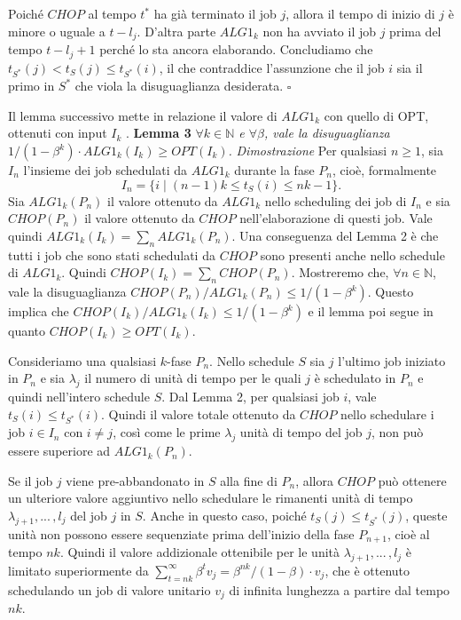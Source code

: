 \documentclass[twoside,openany,titlepage,fleqn,
	headinclude,12pt,a4paper,BCOR5mm,footinclude]{scrbook}
\newcommand*{\N}{\mathbb{N}}
\begin{document}
Poiché $CHOP$  al tempo $t^{*}$ ha già terminato il job $j$,  allora il tempo di inizio di $j$ è minore o uguale a $t - l_{j}$. D'altra parte $ALG1_{k}$ non ha avviato il job $j$ prima del tempo $t - l_{j} + 1$ perché lo sta ancora elaborando. Concludiamo che $t_{S^{*}}(j) < t_{S}(j) \leq t_{S^{*}}(i)$, il che contraddice l'assunzione che il job $i$ sia il primo in $S^{*}$ che viola la disuguaglianza desiderata. \hfill $\square$ \vspace{5mm} 

Il lemma successivo mette in relazione il valore di $ALG1_{k}$ con quello di OPT, ottenuti con input $I_{k}$ . \newline\newline
\textbf{Lemma 3} 
\textit{$\forall k \in \N$ e $\forall \beta$, vale la disuguaglianza $1/(1-\beta^{k} ) \cdot ALG1_{k}(I_{k}) \geq OPT(I_{k})$.}\newline\newline
\textit{Dimostrazione}
Per qualsiasi $n \geq 1$, sia $I_{n}$ l'insieme dei job schedulati da $ALG1_{k}$ durante la fase $P_{n}$, cioè, formalmente $$I_{n} = \{i\;| \; (n - 1)k \leq t_{S}(i) \leq nk - 1\}.$$ Sia $ALG1_{k}(P_{n})$ il valore ottenuto da $ALG1_{k}$ nello scheduling dei job di $I_{n}$ e sia $CHOP(P_{n})$ il valore ottenuto da $CHOP$ nell'elaborazione di questi job. Vale quindi $ALG1_{k}(I_{k}) = \sum_{n} ALG1_{k}(P_{n})$. Una conseguenza del Lemma 2 è che tutti i job che sono stati schedulati da $CHOP$ sono presenti anche nello schedule di $ALG1_{k}$. Quindi $CHOP(I_{k}) = \sum_{n} CHOP(P_{n})$. Mostreremo che, $\forall n \in \N$, vale la disuguaglianza $CHOP(P_{n})/ALG1_{k} (P_{n}) \leq 1/(1 - \beta^{k})$. Questo implica che $CHOP(I_{k})/ALG1_{k} (I_{k} ) \leq 1/(1 - \beta^{k})$ e il lemma poi segue in quanto $CHOP(I_{k}) \geq OPT(I_{k})$. 

Consideriamo una qualsiasi $k$-fase $P_{n}$. Nello schedule $S$ sia $j$ l'ultimo job iniziato in $P_{n}$ e sia $\lambda_{j}$ il numero di unità di tempo per le quali $j$ è schedulato in $P_{n}$ e quindi nell'intero schedule $S$. Dal Lemma 2, per qualsiasi job $i$, vale $t_{S}(i) \leq t_{S^{*}}(i)$. Quindi il valore totale ottenuto da $CHOP$ nello schedulare i job $i \in I_{n}$ con $i \neq j$, così come le prime $\lambda_{j}$ unità di tempo del job $j$, non può essere superiore ad $ALG1_{k}(P_{n})$. 

Se il job $j$ viene pre-abbandonato in $S$ alla fine di $P_{n}$, allora $CHOP$ può ottenere un ulteriore valore aggiuntivo nello schedulare le rimanenti unità di tempo $\lambda_{j + 1},...\,, l_{j}$ del job $j$ in $S$. Anche in questo caso, poiché $t_{S}(j) \leq t_{S^{*}}(j)$, queste unità non possono essere sequenziate prima dell'inizio della fase $P_{n+1}$, cioè al tempo $nk$. Quindi il valore addizionale ottenibile per le unità $\lambda_{j + 1},...\,,l_{j}$ è limitato superiormente da $\sum_{t=nk}^{\infty} \beta^{t} v_{j} = \beta^{nk}/(1 - \beta ) \cdot v_{j}$, che è ottenuto schedulando un job di valore unitario $v_{j}$ di infinita lunghezza a partire dal tempo $nk$. 
\end{document}
